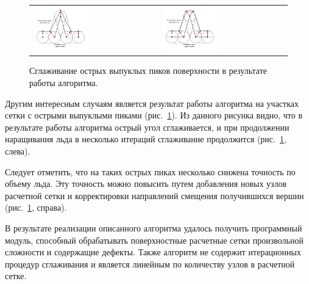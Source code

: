 \begin{figure}[ht]
\centering
\begin{tabular}{ll}
\includegraphics[width=0.45\textwidth]{./pics/text_1_remesh_common_envelope/peak1.pdf}
&
\includegraphics[width=0.45\textwidth]{./pics/text_1_remesh_common_envelope/peak2.pdf}
\end{tabular}
\singlespacing
{}\caption{Сглаживание острых выпуклых пиков поверхности в результате работы алгоритма.}
\label{fig:text_1_remesh3_common_envelope_peak}
\end{figure}

Другим интересным случаям является результат работы алгоритма на участках сетки с острыми выпуклыми пиками (рис.~\ref{fig:text_1_remesh3_common_envelope_peak}).
Из данного рисунка видно, что в результате работы алгоритма острый угол сглаживается, и при продолжении наращивания льда в несколько итераций сглаживание продолжится (рис.~\ref{fig:text_1_remesh3_common_envelope_peak}, слева).

Следует отметить, что на таких острых пиках несколько снижена точность по объему льда.
Эту точность можно повысить путем добавления новых узлов расчетной сетки и корректировки направлений смещения получившихся вершин (рис.~\ref{fig:text_1_remesh3_common_envelope_peak}, справа).

В результате реализации описанного алгоритма удалось получить программный модуль, способный обрабатывать поверхностные расчетные сетки произвольной сложности и содержащие дефекты.
Также алгоритм не содержит итерационных процедур сглаживания и является линейным по количеству узлов в расчетной сетке.

